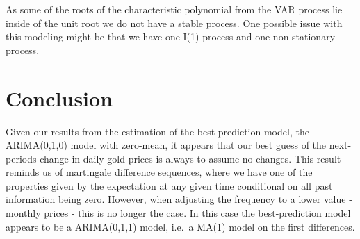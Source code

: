 \documentclass[a4paper]{article}
\theoremstyle{definition}
\begin{document}
As some of the roots of the characteristic polynomial from the VAR process lie inside of the unit root we do not have a stable process. One possible issue with this modeling might be that we have one I(1) process and one non-stationary process. 
\section{Conclusion}
Given our results from the estimation of the best-prediction model, the ARIMA(0,1,0) model with zero-mean, it appears that our best guess of the next-periods change in daily gold prices is always to assume no changes. This result reminds us of martingale difference sequences, where we have one of the properties given by the expectation at any given time conditional on all past information being zero. However, when adjusting the frequency to a lower value - monthly prices - this is no longer the case. In this case the best-prediction model appears to be a ARIMA(0,1,1) model, i.e.\ a MA(1) model on the first differences. 
%
%
%
%
%
%
%
%
\newpage
{}
\printbibliography
\end{document}
